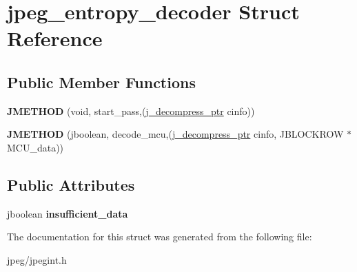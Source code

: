 \hypertarget{structjpeg__entropy__decoder}{}\section{jpeg\+\_\+entropy\+\_\+decoder Struct Reference}
\label{structjpeg__entropy__decoder}
\subsection*{Public Member Functions}
\begin{DoxyCompactItemize}
\item 
{\bfseries J\+M\+E\+T\+H\+OD} (void, start\+\_\+pass,(\hyperlink{structjpeg__decompress__struct}{j\+\_\+decompress\+\_\+ptr} cinfo))\hypertarget{structjpeg__entropy__decoder_ab1b90e7d9348599cecc7b6c86d291ae4}{}\label{structjpeg__entropy__decoder_ab1b90e7d9348599cecc7b6c86d291ae4}

\item 
{\bfseries J\+M\+E\+T\+H\+OD} (jboolean, decode\+\_\+mcu,(\hyperlink{structjpeg__decompress__struct}{j\+\_\+decompress\+\_\+ptr} cinfo, J\+B\+L\+O\+C\+K\+R\+OW $\ast$M\+C\+U\+\_\+data))\hypertarget{structjpeg__entropy__decoder_ad2d324fdcc526f0ab3684b56253d1766}{}\label{structjpeg__entropy__decoder_ad2d324fdcc526f0ab3684b56253d1766}

\end{DoxyCompactItemize}
\subsection*{Public Attributes}
\begin{DoxyCompactItemize}
\item 
jboolean {\bfseries insufficient\+\_\+data}\hypertarget{structjpeg__entropy__decoder_ae40fe3a01f48083998342fa6b0f4c22d}{}\label{structjpeg__entropy__decoder_ae40fe3a01f48083998342fa6b0f4c22d}

\end{DoxyCompactItemize}


The documentation for this struct was generated from the following file\+:\begin{DoxyCompactItemize}
\item 
jpeg/jpegint.\+h\end{DoxyCompactItemize}
